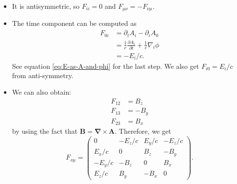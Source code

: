 \documentclass{article}
\numberwithin{equation}{section}
\begin{document}
\begin{itemize}
    \item It is antisymmetric, so $F_{ii} = 0$ and $F_{\mu\nu} = -F_{\nu\mu}.$
    \item The time component can be computed as 
    \begin{align}
        F_{0i} &= \partial_t A_i - \partial_i A_0 \\ 
        &= \frac{1}{c} \frac{\partial A_i}{\partial t} + \frac{1}{c}\nabla_i \phi \\ 
        &= -E_i/c.
    \end{align}
    See equation \ref{eq:E-as-A-and-phi} for the last step. We also get $F_{i0} = E_i/c$ from anti-symmetry.
    \item We can also obtain:
    \begin{align}
        F_{12} &= B_z \\ 
        F_{13} &= -B_y \\ 
        F_{23} &= B_x
    \end{align}
     by using the fact that $\bm{B} = \bm{\nabla} \times \bm{A}.$ Therefore, we get 
     \begin{equation}
        F_{\nu\mu} = \begin{pmatrix}
            0 & -E_z/c & E_y/c & -E_z/c \\ 
            E_x/c & 0 & B_z & -B_y \\ 
            -E_y/c & -B_z & 0 & B_x \\
            E_z/c & B_y & -B_x & 0
        \end{pmatrix}.
     \end{equation}
\end{itemize}
\end{document}

